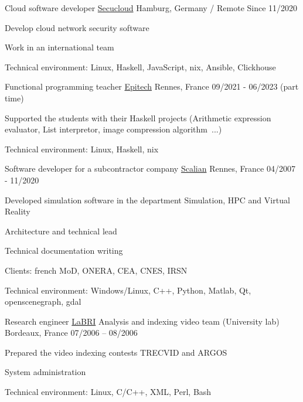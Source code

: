 \begin{cventries}
  \cventry
    {Cloud software developer}
    {\href{https://www.linkedin.com/company/secucloud/}{Secucloud}}
    {Hamburg, Germany / Remote}
    {Since 11/2020}
    {
      \begin{cvitems}
        \item {Develop cloud network security software}
        \item {Work in an international team}
        \item {Technical environment: Linux, Haskell, JavaScript, nix,
            Ansible, Clickhouse}
      \end{cvitems}
    }

  \cventry
    {Functional programming teacher}
    {\href{https://www.epitech.eu/}{Epitech}}
    {Rennes, France}
    {09/2021 - 06/2023 (part time)}
    {
      \begin{cvitems}
          \item {Supported the students with their Haskell projects
              (Arithmetic expression evaluator, List interpretor, image
              compression algorithm~...)}
          \item {Technical environment: Linux, Haskell, nix}
      \end{cvitems}
    }

  \cventry
    {Software developer for a subcontractor company}
    {\href{https://www.scalian.com/}{Scalian}}
    {Rennes, France}
    {04/2007 - 11/2020}
    {
      \begin{cvitems}
        \item {Developed simulation software in the department Simulation, HPC
            and Virtual Reality}
        \item {Architecture and technical lead}
        \item {Technical documentation writing}
        \item {Clients: french MoD, ONERA, CEA, CNES, IRSN}
        \item {Technical environment: Windows/Linux, C++, Python, Matlab, Qt,
            openscenegraph, gdal}
      \end{cvitems}
    }

  \cventry
    {Research engineer}
    {\href{https://www.labri.fr/}{LaBRI} Analysis and indexing video team
    (University lab)} {Bordeaux, France}
    {07/2006 – 08/2006}
    {
      \begin{cvitems}
        \item {Prepared the video indexing contests TRECVID and ARGOS}
        \item {System administration}
        \item {Technical environment: Linux, C/C++, XML, Perl, Bash}
      \end{cvitems}
    }


\end{cventries}
